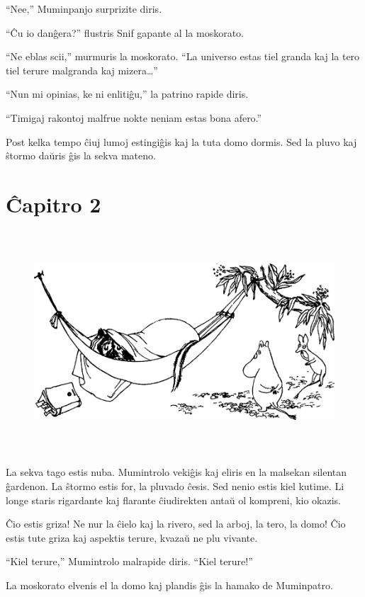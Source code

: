 ``Nee,'' Muminpanjo surprizite diris.

``Ĉu io danĝera?'' flustris Snif gapante al la moskorato.

``Ne eblas scii,'' murmuris la moskorato. ``La universo estas tiel granda kaj la tero tiel terure malgranda kaj mizera{\ldots}''

``Nun mi opinias, ke ni enlitiĝu,'' la patrino rapide diris.

``Timigaj rakontoj malfrue nokte neniam estas bona afero.''

Post kelka tempo ĉiuj lumoj estingiĝis kaj la tuta domo dormis. Sed la pluvo kaj ŝtormo daŭris ĝis la sekva mateno.

\chapter*[Ĉapitro 2]{Ĉapitro 2}


\begin{figure}[htbp]
\centering
\includegraphics[width=450pt,height=234pt]{2-1.png}
\caption{}
\label{2-1}
\end{figure}

\noindent La sekva tago estis nuba. Mumintrolo vekiĝis kaj eliris en la malsekan silentan ĝardenon. La ŝtormo estis for, la pluvado ĉesis. Sed nenio estis kiel kutime. Li longe staris rigardante kaj flarante ĉiudirekten antaŭ ol kompreni, kio okazis.

Ĉio estis griza! Ne nur la ĉielo kaj la rivero, sed la arboj, la tero, la domo! Ĉio estis tute griza kaj aspektis terure, kvazaŭ ne plu vivante.

``Kiel terure,'' Mumintrolo malrapide diris. ``Kiel terure!''

La moskorato elvenis el la domo kaj plandis ĝis la hamako de Muminpatro.

